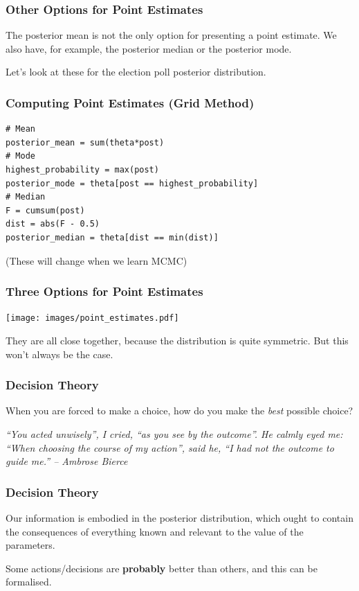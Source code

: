 \documentclass{beamer}
\begin{document}
\begin{frame}
\frametitle{Other Options for Point Estimates}
The posterior mean is not the only option for presenting a point estimate.
We also have, for example, the posterior median or the posterior mode.\\[0.5em]\pause

Let's look at these for the election poll posterior distribution.
\end{frame}

\begin{frame}[fragile]
\frametitle{Computing Point Estimates (Grid Method)}

\begin{verbatim}
# Mean
posterior_mean = sum(theta*post)
# Mode
highest_probability = max(post)
posterior_mode = theta[post == highest_probability]
# Median
F = cumsum(post)
dist = abs(F - 0.5)
posterior_median = theta[dist == min(dist)]
\end{verbatim}
(These will change when we learn MCMC)

\end{frame}



\begin{frame}
\frametitle{Three Options for Point Estimates}
\begin{center}
\texttt{[image: images/point\_estimates.pdf]}
\end{center}

They are all close together, because the distribution is quite symmetric.
But this won't always be the case.

\end{frame}



\begin{frame}
\frametitle{Decision Theory}
When you are forced to make a choice, how do you make the {\em best} possible
choice?\\[0.7em]
\pause

{\em 
``You acted unwisely'', I cried, ``as you see
by the outcome''. He calmly eyed me:
``When choosing the course of my action'', said he, ``I had
not the outcome to guide me.'' -- Ambrose Bierce
}

\end{frame}


\begin{frame}
\frametitle{Decision Theory}
Our information is embodied in the posterior distribution,
which ought to contain the consequences of everything
known and relevant to the value of the parameters.
\pause

Some actions/decisions are {\bf probably} better than others,
and this can be formalised.
\end{frame}
\end{document}
